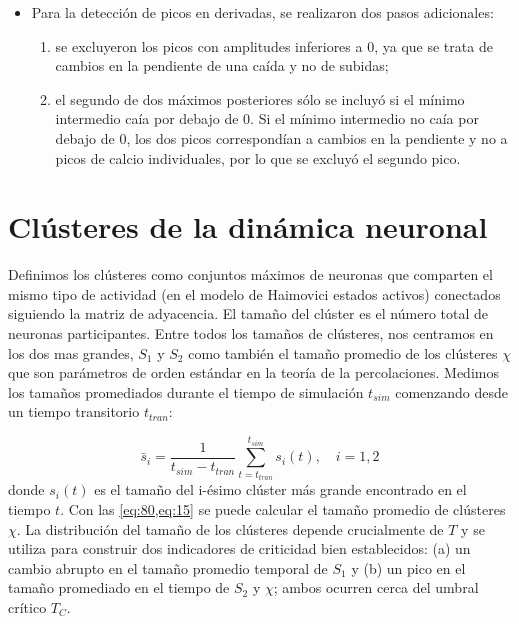 \begin{enumerate}
\begin{itemize}
		\item Para la detección de picos en derivadas, se realizaron dos pasos adicionales:
		\begin{enumerate}[label=(\roman*)]
			\item se excluyeron los picos con amplitudes inferiores a 0, ya que se trata de cambios en la pendiente de una caída y no de subidas; 
			\item el segundo de dos máximos posteriores sólo se incluyó si el mínimo intermedio caía por debajo de 0. Si el mínimo intermedio no caía por debajo de 0, los dos picos correspondían a cambios en la pendiente y no a picos de calcio individuales, por lo que se excluyó el segundo pico.
		\end{enumerate}
		
	\end{itemize}
\end{enumerate}


\section{Clústeres de la dinámica neuronal}\label{sec:clusteres}

Definimos los clústeres como conjuntos máximos de neuronas que comparten el mismo tipo de actividad (en el modelo de Haimovici estados activos) conectados siguiendo la matriz de adyacencia. El tamaño del clúster es el número total de neuronas participantes. Entre todos los tamaños de clústeres, nos centramos en los dos mas grandes, $S_1$ y $S_2$ como también el tamaño promedio de los clústeres $\chi$ que son parámetros de orden estándar en la teoría de la percolaciones. Medimos los tamaños promediados durante el tiempo de simulación $t_{sim}$ comenzando desde un tiempo transitorio  $t_{tran}$:

\begin{equation}\label{eq:80}
	\bar{s}_i=\frac{1}{t_{sim}-t_{tran}}\sum_{t=t_{tran}}^{t_{sim}}s_i(t), \quad i=1,2
\end{equation}
donde $s_i(t)$  es el tamaño del i-ésimo  clúster más grande encontrado en el tiempo $t$.   Con las \cref{eq:80,eq:15}  se puede calcular el tamaño promedio de clústeres $\chi$.  La distribución del tamaño de los clústeres depende crucialmente de $T$ y se utiliza para construir dos indicadores de criticidad bien establecidos: (a) un cambio abrupto en el tamaño promedio temporal de $S_1$
y (b) un pico en el tamaño promediado en el tiempo de $S_2$ y $\chi$; ambos ocurren cerca del umbral crítico $T_C$. 

